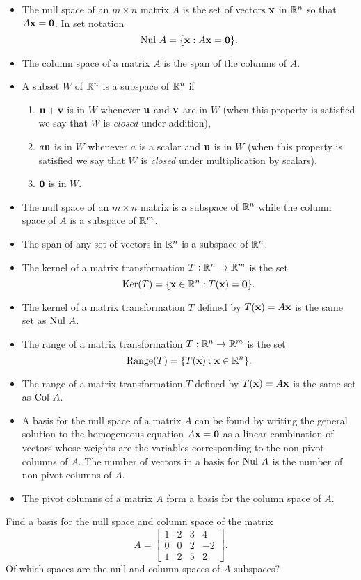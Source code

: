 \begin{itemize}
\item The null space of an $m \times n$ matrix $A$ is the set of vectors $\mathbf{x}$ in $\mathbb{R}^n$ so that $A \mathbf{x} = \mathbf{0}$. In set notation
\[\text{Nul } A = \{\mathbf{x} : A \mathbf{x} = \mathbf{0}\}.\]
\item The column space of a matrix $A$ is the span of the columns of $A$.
\item A subset $W$ of $\mathbb{R}^n$ is a subspace of $\mathbb{R}^n$ if
\begin{enumerate}
\item $\mathbf{u} + \mathbf{v}$ is in $W$ whenever $\mathbf{u}$ and $\mathbf{v}$ are in $W$ (when this property is satisfied we say that $W$ is \emph{closed} under addition),
\item $a \mathbf{u}$ is in $W$ whenever $a$ is a scalar and $\mathbf{u}$ is in $W$ (when this property is satisfied we say that $W$ is \emph{closed} under multiplication by scalars),
\item $\mathbf{0}$ is in $W$.
\end{enumerate}
\item The null space of an $m \times n$ matrix is a subspace of $\mathbb{R}^n$ while the column space of $A$ is a subspace of $\mathbb{R}^m$.
\item The span of any set of vectors in $\mathbb{R}^n$ is a subspace of $\mathbb{R}^n$. 
\item The kernel of a matrix transformation $T : \mathbb{R}^n \to \mathbb{R}^m$ is the set 
\[\text{Ker}(T) = \{\mathbf{x} \in \mathbb{R}^n : T(\mathbf{x}) = \mathbf{0}\}.\]
\item The kernel of a matrix transformation $T$ defined by $T(\mathbf{x}) = A\mathbf{x}$ is the same set as $\text{Nul } A$. 
\item The range of a matrix transformation $T : \mathbb{R}^n \to \mathbb{R}^m$ is the set 
\[\text{Range}(T) = \{T(\mathbf{x}) : \mathbf{x} \in \mathbb{R}^n\}.\]
\item The range of a matrix transformation $T$ defined by $T(\mathbf{x}) = A\mathbf{x}$ is the same set as $\text{Col } A$. 
\item A basis for the null space of a matrix $A$ can be found by writing the general solution to the homogeneous equation $A \mathbf{x} = \mathbf{0}$ as a linear combination of vectors whose weights are the variables corresponding to the non-pivot columns of $A$. The number of vectors in a basis for $\text{Nul } A$ is the number of non-pivot columns of $A$.
\item The pivot columns of a matrix $A$ form a basis for the column space of $A$.
\end{itemize}



\label{sec:null_exer}
\be
\item Find a basis for the null space and column space of the matrix 
\[A=\left[ \begin{array}{cccr} 1 & 2& 3& 4\\ 0 & 0 & 2 & -2 \\ 1 & 2 & 5 & 2 \end{array} \right].\]
Of which spaces are the null and column spaces of $A$ subspaces?


